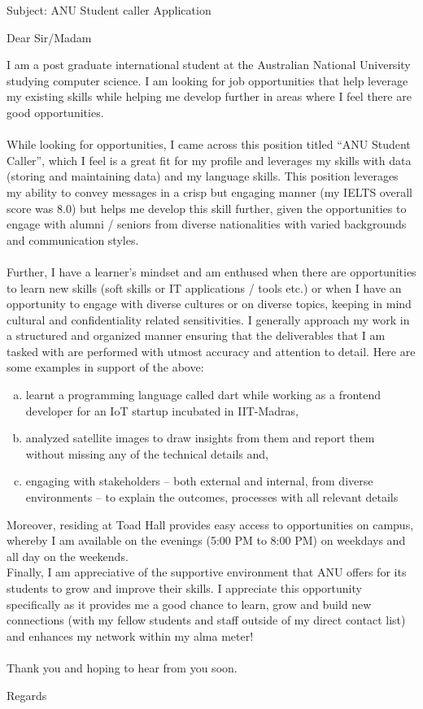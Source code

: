 \documentclass{letter}
\begin{document}
\begin{letter}{Subject: ANU Student caller Application }
\opening{Dear Sir/Madam}
I am a post graduate international student at the Australian National University studying computer science. I am looking for job opportunities that help leverage my existing skills while helping me develop further in areas where I feel there are good opportunities.\\ \\
 While looking for opportunities, I came across this position titled “ANU Student Caller”, which I feel is a great fit for my profile and leverages my skills with data (storing and maintaining data) and my language skills. This position leverages my ability to convey messages in a crisp but engaging manner (my IELTS overall score was 8.0) but helps me develop this skill further, given the opportunities to engage with alumni / seniors from diverse nationalities with varied backgrounds and communication styles. \\ \\
Further, I have a learner’s mindset and am enthused when there are opportunities to learn new skills (soft skills or IT applications / tools etc.)  or when I have an opportunity to engage with diverse cultures or on diverse topics, keeping in mind cultural and confidentiality related sensitivities. I generally approach my work in a structured and organized manner ensuring that the deliverables that I am tasked with are performed with utmost accuracy and attention to detail. Here are some examples in support of the above:
\begin{enumerate}[(a)]
	\item learnt a programming language called dart while working as a frontend developer for an IoT startup incubated in IIT-Madras, 
	\item analyzed satellite images to draw insights from them and report them without missing any of the technical details and,
	\item engaging with stakeholders – both external and internal, from diverse environments – to explain the outcomes, processes with all relevant details 
\end{enumerate}
 Moreover, residing at Toad Hall provides easy access to opportunities on campus, whereby I am available on the evenings (5:00 PM to 8:00 PM) on weekdays and all day on the weekends.
\\Finally, I am appreciative of the supportive environment that ANU offers for its students to grow and improve their skills. I appreciate this opportunity specifically as it provides me a good chance to learn, grow and build new connections (with my fellow students and staff outside of my direct contact list) and enhances my network within my alma meter! \\ \\
Thank you and hoping to hear from you soon.
\closing{Regards}
\end{letter}
\end{document}
